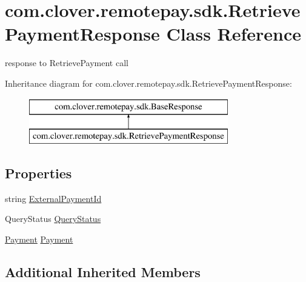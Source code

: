 \hypertarget{classcom_1_1clover_1_1remotepay_1_1sdk_1_1_retrieve_payment_response}{}\section{com.\+clover.\+remotepay.\+sdk.\+Retrieve\+Payment\+Response Class Reference}
\label{classcom_1_1clover_1_1remotepay_1_1sdk_1_1_retrieve_payment_response}


response to Retrieve\+Payment call  


Inheritance diagram for com.\+clover.\+remotepay.\+sdk.\+Retrieve\+Payment\+Response\+:\begin{figure}[H]
\begin{center}
\leavevmode
\includegraphics[height=2.000000cm]{classcom_1_1clover_1_1remotepay_1_1sdk_1_1_retrieve_payment_response}
\end{center}
\end{figure}
\subsection*{Properties}
\begin{DoxyCompactItemize}
\item 
string \hyperlink{classcom_1_1clover_1_1remotepay_1_1sdk_1_1_retrieve_payment_response_aa2fab33f9e57b6273ee688decf6f871d}{External\+Payment\+Id}
\item 
Query\+Status \hyperlink{classcom_1_1clover_1_1remotepay_1_1sdk_1_1_retrieve_payment_response_ad3ad4b7c6f84ce21594b187cfab54dc8}{Query\+Status}
\item 
\hyperlink{classcom_1_1clover_1_1sdk_1_1v3_1_1payments_1_1_payment}{Payment} \hyperlink{classcom_1_1clover_1_1remotepay_1_1sdk_1_1_retrieve_payment_response_aa6333edc6d00e11ca5312a34d2fe1003}{Payment}
\end{DoxyCompactItemize}
\subsection*{Additional Inherited Members}


